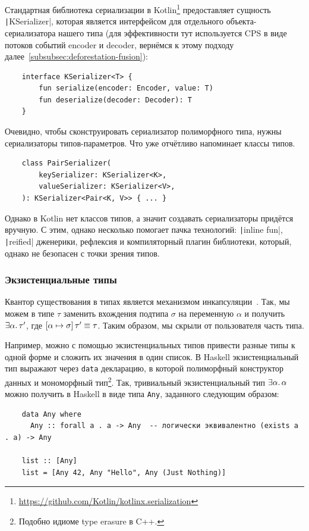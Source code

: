 Стандартная библиотека сериализации в Kotlin\footnote{\url{https://github.com/Kotlin/kotlinx.serialization}} предоставляет сущность \texttt|KSerializer|, которая является интерфейсом для отдельного объекта-сериализатора нашего типа (для эффективности тут используется CPS в виде потоков событий encoder и decoder, вернёмся к этому подходу далее\ \ref{subsubsec:deforestation-fusion}):
\begin{verbatim}
    interface KSerializer<T> {
        fun serialize(encoder: Encoder, value: T)
        fun deserialize(decoder: Decoder): T
    }
\end{verbatim}

Очевидно, чтобы сконструировать сериализатор полиморфного типа, нужны сериализаторы типов-параметров.
Что уже отчётливо напоминает классы типов.
\begin{verbatim}
    class PairSerializer(
        keySerializer: KSerializer<K>,
        valueSerializer: KSerializer<V>,
    ): KSerializer<Pair<K, V>> { ... }
\end{verbatim}

Однако в Kotlin нет классов типов, а значит создавать сериализаторы придётся вручную.
С этим, однако несколько помогает пачка технологий: \texttt|inline fun|, \texttt|reified| дженерики, рефлексия и компиляторный плагин библиотеки, который, однако не безопасен с точки зрения типов.

\subsubsection{Экзистенциальные типы} \label{subsubsec:existentials}

Квантор существования в типах является механизмом инкапсуляции~\cite[глава 24]{pierce2002types}.
Так, мы можем в типе $\tau$ заменить вхождения подтипа $\sigma$ на переменную $\alpha$ и получить $\exists \alpha\ldotp \tau'$, где $\left[\alpha \mapsto \sigma \right] \tau'\equiv\tau$.
Таким образом, мы скрыли от пользователя часть типа.

Например, можно с помощью экзистенциальных типов привести разные типы к одной форме и сложить их значения в один список.
В Haskell экзистенциальный тип выражают через \texttt{data} декларацию, в которой полиморфный конструктор данных и мономорфный тип\footnote{Подобно идиоме type erasure в C++.}.
Так, тривиальный экзистенциальный тип $\exists \alpha\ldotp \alpha$ можно получить в Haskell в виде типа \texttt{Any}, заданного следующим образом:
\begin{verbatim}
    data Any where
      Any :: forall a . a -> Any  -- логически эквивалентно (exists a . a) -> Any

    list :: [Any]
    list = [Any 42, Any "Hello", Any (Just Nothing)]
\end{verbatim}


